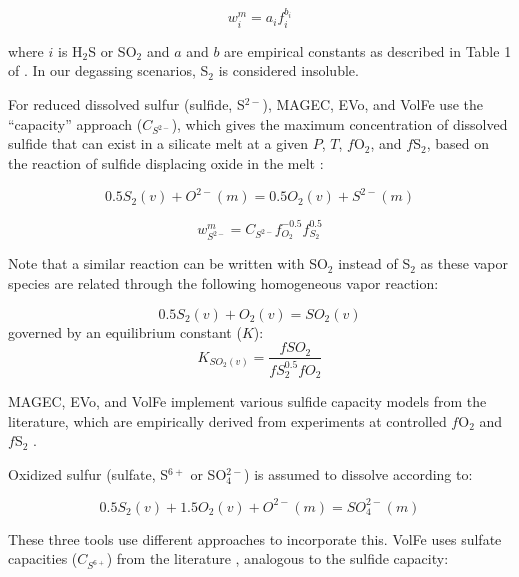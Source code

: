 \documentclass[draft, english]{volcanica-template}
\begin{document}
\begin{equation}
    w^m_{i} = a_if_i^{b_i}
    \label{eq:DCOMP}
\end{equation}

\noindent where $i$ is H$_2$S or SO$_2$ and $a$ and $b$ are empirical constants as described in Table 1 of \textcite{Burgisser2015}. In our degassing scenarios, S$_2$ is considered insoluble.

For reduced dissolved sulfur (sulfide, S$^{2-}$), MAGEC, EVo, and VolFe use the ``capacity'' approach ($C_{S^{2-}}$), which gives the maximum concentration of dissolved sulfide that can exist in a silicate melt at a given $P$, $T$, $f$O$_2$, and $f$S$_2$, based on the reaction of sulfide displacing oxide in the melt \parencite{fincham-richardson1954}: 

\begin{equation}
    0.5S_2(v) + O^{2-}(m) = 0.5O_2(v) + S^{2-}(m)
    \label{eq:capacity_red}
\end{equation}

\begin{equation}
    w^m_{S^{2-}} = C_{S^{2-}}f_{O_2}^{-0.5}f_{S_2}^{0.5}
\end{equation}

\noindent Note that a similar reaction can be written with SO$_2$ instead of S$_2$ as these vapor species are related through the following homogeneous vapor reaction:

\begin{equation}
    0.5S_2(v) + O_2(v) = SO_2(v)
    \label{eq:SO2v}
\end{equation}
governed by an equilibrium constant ($K$):
\begin{equation}
    K_{SO_2(v)} = \frac{fSO_2}{fS_2^{0.5}fO_2}
\end{equation}


\noindent MAGEC, EVo, and VolFe implement various sulfide capacity models from the literature, which are empirically derived from experiments at controlled $f$O$_2$ and $f$S$_2$ \parencite[e.g.,][]{ONeill2021,boulliung2023sulfur,thomas-wood2026,gorojovsky2026solubility,o2002sulfide,nzotta1999}. 

Oxidized sulfur (sulfate, S$^{6+}$ or SO$_4^{2-}$) is assumed to dissolve according to:

\begin{equation}
    0.5S_2(v) + 1.5O_2(v) + O^{2-}(m) = SO_4^{2-}(m)
    \label{eq:capacity_ox}
\end{equation}

\noindent These three tools use different approaches to incorporate this. VolFe uses sulfate capacities ($C_{S^{6+}}$) from the literature \parencite[e.g.,][]{Oneill2022,boulliung2023sulfur,thomas-wood2026,gorojovsky2026solubility,boulliung2022so2}, analogous to the sulfide capacity:
\end{document}
